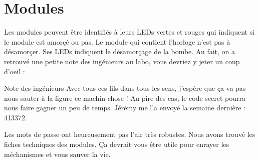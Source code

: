 \chapter{Modules}
Les modules peuvent être identifiés à leurs LEDs vertes et rouges qui indiquent
si le module est amorçé ou pas. Le module qui contient l'horloge n'est pas à
désamorçer. Ses LEDs indiquent le désamorçage de la bombe. Au fait, on a
retrouvé une petite note des ingénieurs au labo, vous devriez y jeter un coup
d'oeil :
\vspace{.5cm}
\begin{paperbox}{Note des ingénieurs}
  Avec tous ces fils dans tous les sens, j'espère que ça va pas nous sauter à la
  figure ce machin-chose ! Au pire des cas, le code secret pourra nous faire
  gagner un peu de temps. Jérémy me l'a envoyé la semaine dernière : 413372.
\end{paperbox}
\vspace{.5cm}

Les mots de passe ont heureusement pas l'air très robustes. Nous avons trouvé
les fiches techniques des modules. Ça devrait vous être utile pour enrayer les
méchanismes et vous sauver la vie.
\newpage

